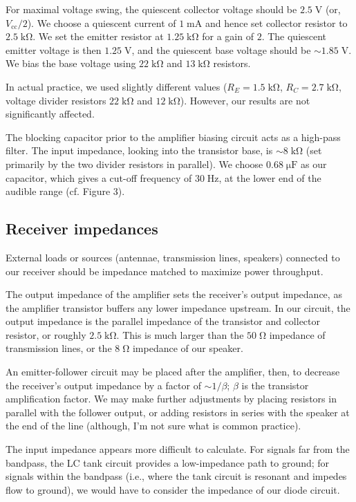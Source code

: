 \documentclass[11pt]{article}
\newcommand {\mt}{\mathrm}
\newcommand {\unit}[1]{\; \mt{#1}}
\begin{document}
For maximal voltage swing, the quiescent collector voltage should be
$2.5 \unit{V}$ (or, $V_{\mt{cc}}/2$).  We choose a quiescent current of
$1 \unit{mA}$ and hence set collector resistor to $2.5 \unit{k\Omega}$.  We set
the emitter resistor at $1.25 \unit{k\Omega}$ for a gain of $2$. The quiescent
emitter voltage is then $1.25 \unit{V}$, and the quiescent base voltage
should be $\sim 1.85 \unit{V}$.  We bias the base voltage using
$22 \unit{k\Omega}$ and $13 \unit{k\Omega}$ resistors.

In actual practice, we used slightly different values ($R_E = 1.5
\unit{k\Omega}$, $R_C = 2.7 \unit{k\Omega}$, voltage divider resistors $22
\unit{k\Omega}$ and $12 \unit{k\Omega}$).  However, our results are not
significantly affected.

The blocking capacitor prior to the amplifier biasing circuit acts as a
high-pass filter.  The input impedance, looking into the transistor
base, is $\sim 8 \unit{k\Omega}$ (set primarily by the two divider resistors
in parallel).  We choose $0.68 \unit{\mu F}$ as our capacitor, which gives a
cut-off frequency of $30 \unit{Hz}$, at the lower end of the audible range
(cf. Figure 3).

\subsection{Receiver impedances}

External loads or sources (antennae, transmission lines, speakers) connected to
our receiver should be impedance matched to maximize power throughput.

The output impedance of the amplifier sets the receiver's output impedance, as
the amplifier transistor buffers any lower impedance upstream.  In our circuit,
the output impedance is the parallel impedance of the transistor and collector
resistor, or roughly $2.5 \unit{k\Omega}$.  This is much larger than the $50
\unit{\Omega}$ impedance of transmission lines, or the $8 \unit{\Omega}$
impedance of our speaker.

An emitter-follower circuit may be placed after the amplifier, then, to
decrease the receiver's output impedance by a factor of $\sim 1/\beta$; $\beta$
is the transistor amplification factor.  We may make further adjustments by
placing resistors in parallel with the follower output, or adding resistors in
series with the speaker at the end of the line (although, I'm not sure what is
common practice).

The input impedance appears more difficult to calculate.  For signals far from
the bandpass, the LC tank circuit provides a low-impedance path to ground; for
signals within the bandpass (i.e., where the tank circuit is resonant and
impedes flow to ground), we would have to consider the impedance of our diode
circuit.
\end{document}
